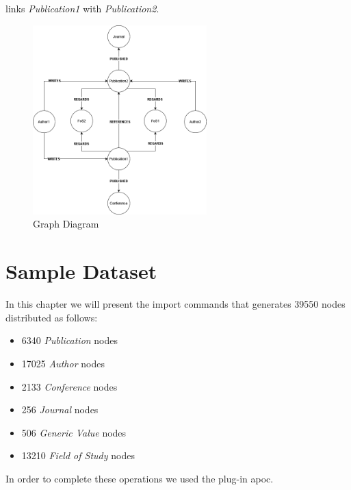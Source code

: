 \documentclass{Configuration_Files/PoliMi3i_thesis}
\begin{document}
links \emph{Publication1} with \emph{Publication2}.
\begin{figure}[H]
    \centering
    \includegraphics[width=0.6\textwidth]{graphDiagram.png}
    \caption{Graph Diagram}
    \label{fig:graphDiagram}
\end{figure}

\chapter{Sample Dataset}
In this chapter we will present the import commands that generates 39550 nodes distributed as follows:
\begin{itemize}
    \item 6340 \emph{Publication} nodes
    \item 17025 \emph{Author} nodes
    \item 2133 \emph{Conference} nodes
    \item 256 \emph{Journal} nodes
    \item 506 \emph{Generic Value} nodes
    \item 13210 \emph{Field of Study} nodes
\end{itemize}
In order to complete these operations we used the plug-in apoc.
\end{document}
